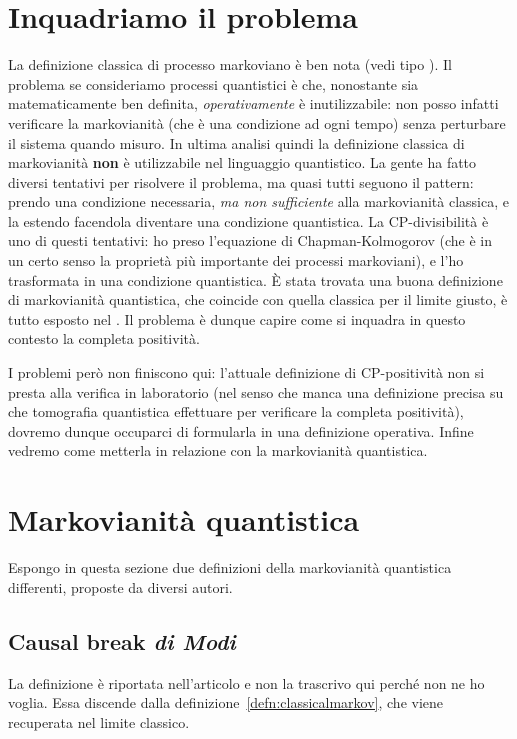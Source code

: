 \documentclass[a4]{article}
\begin{document}
\section{Inquadriamo il problema}
La definizione classica di processo markoviano è ben nota (vedi tipo \cite{breuer2007theory, markovcondition}).
Il problema se consideriamo processi quantistici è che, nonostante sia matematicamente
ben definita, \emph{operativamente} è inutilizzabile: non posso infatti verificare
la markovianità (che è una condizione ad  ogni tempo) senza perturbare il sistema
quando misuro. In ultima analisi quindi  la definizione classica di markovianità
\textbf{non} è utilizzabile nel linguaggio quantistico.
La gente ha fatto diversi tentativi per risolvere il problema, ma quasi tutti seguono
il pattern: prendo una condizione necessaria, \emph{ma non sufficiente} alla markovianità
classica, e la estendo facendola diventare una condizione quantistica. La CP-divisibilità
è uno di questi tentativi: ho preso l'equazione di Chapman-Kolmogorov (che è in un certo
senso la proprietà più importante dei processi markoviani), e l'ho trasformata in una
condizione  quantistica.
È stata  trovata una buona definizione di markovianità quantistica, che coincide con
quella classica per il limite giusto, è tutto esposto nel \cite{markovcondition}.
Il problema è dunque capire come si inquadra in questo  contesto la completa positività.

I problemi però non finiscono qui: l'attuale definizione di CP-positività non si presta alla
verifica in laboratorio  (nel senso  che manca una definizione precisa su che tomografia
quantistica effettuare per verificare la completa positività), dovremo dunque occuparci
di formularla in una definizione operativa.
Infine vedremo come metterla in relazione con la markovianità quantistica.

\section{Markovianità quantistica}
Espongo in questa sezione due definizioni della markovianità quantistica differenti,
proposte da diversi autori.
\subsection{Causal break \textit{di Modi} \cite{markovcondition}}
La definizione è riportata nell'articolo \cite{markovcondition} e non la trascrivo qui
perché non ne ho voglia. Essa discende dalla definizione~\ref{defn:classicalmarkov},
che viene recuperata nel limite classico.
\end{document}
